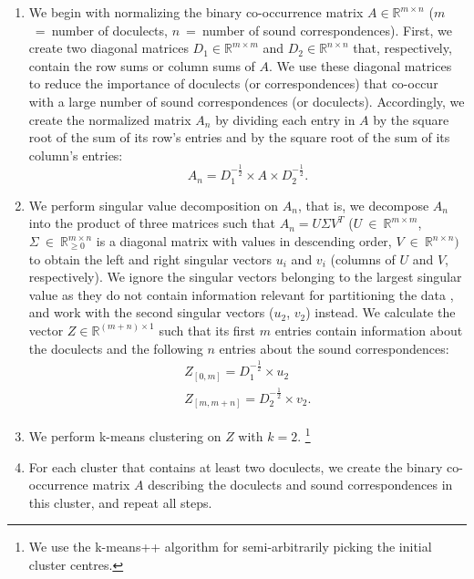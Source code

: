\documentclass[a4paper]{article}
\newcommand{\R}{\mathds{R}}
\begin{document}
\begin{enumerate}
\item 
We begin with normalizing the binary co-occurrence matrix
$A \in \R^{m \times n}$ ($m$~=~number of doculects, $n$~=~number of sound correspondences).
First, we create two diagonal matrices
$D_1  \in \R^{m \times m}$ and $D_2 \in \R^{n \times n}$ that, respectively,
contain the row sums or column sums of $A$.
We use these diagonal matrices to reduce
the importance of doculects (or correspondences)
that co-occur with a large number
of sound correspondences (or doculects).
Accordingly, we create the normalized matrix $A_n$
by dividing each entry in $A$ by
the square root of the sum of its row's entries
and by the square root of the sum of its column's entries:
\begin{equation*}
A_n = D_1^{-\frac{1}{2}} \times A \times D_2^{-\frac{1}{2}}.
\end{equation*}

\item
We perform singular value decomposition on $A_n$,
that is, we decompose $A_n$ into the product of three matrices such that
$A_n = U\Sigma{}V^T$
($U~\in~\R^{m \times m}$,
$\Sigma{}~\in~\R_{\geq 0}^{m \times n}$ is a 
diagonal matrix with values in descending order,
$V~\in~\R^{n \times n})$
to obtain the left and right singular vectors $u_i$ and $v_i$
(columns of $U$ and $V$, respectively).
We ignore the singular vectors belonging
to the largest singular value as they do not contain
information relevant for partitioning the data \citep{kluger2003spectral},
and work with the second singular vectors ($u_2$, $v_2$) instead.
We calculate the vector $Z \in \R^{(m + n) \times 1}$ such that
its first $m$ entries contain information about the doculects
and the following $n$ entries about the sound correspondences:
\begin{align*}
Z_{[0, m]} = D_1^{-\frac{1}{2}} \times u_2\\
Z_{[m, m+n]} = D_2^{-\frac{1}{2}} \times v_2
.
\end{align*}

\item
We perform k-means clustering on $Z$ with $k = 2$.%
\footnote{%
We use the k-means++ algorithm \citep{arthur2007kmeanspp} for semi-arbitrarily picking the initial cluster centres.}

\item
For each cluster that contains at least two doculects,
we create the binary co-occurrence matrix $A$ describing
the doculects and sound correspondences in this cluster,
and repeat all steps.
\end{enumerate}
\end{document}
